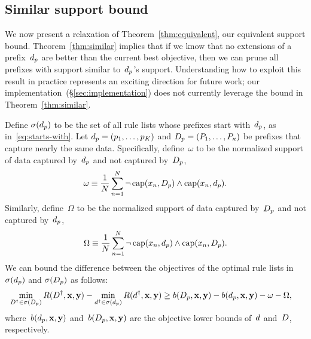 \begin{arxiv}
\subsection{Similar support bound}
\label{sec:similar}

We now present a relaxation of Theorem~\ref{thm:equivalent},
our equivalent support bound.
%
Theorem~\ref{thm:similar} implies that if we know that no extensions of
a prefix~$d_p$ are better than the current best objective,
then we can prune all prefixes with support similar to~$d_p$'s support.
%
Understanding how to exploit this result in practice
represents an exciting direction for future work;
our implementation~(\S\ref{sec:implementation}) does not
currently leverage the bound in Theorem~\ref{thm:similar}.

\begin{theorem}
\label{thm:similar}
Define $\sigma(d_p)$ to be the set of all rule lists
whose prefixes start with~$d_p$, as in~\eqref{eq:starts-with}.
%
Let ${d_p = (p_1, \dots, p_K)}$ and
${D_p = (P_1, \dots, P_{\kappa})}$ be prefixes
that capture nearly the same data.
%
Specifically, define~$\omega$ to be the normalized support
of data captured by~$d_p$ and not captured by~$D_p$, \ie
\begin{align}
\omega \equiv \frac{1}{N} \sum_{n=1}^N
  \neg\, \Cap(x_n, \PrefixB)
  \wedge \Cap(x_n, \Prefix). %
\label{eq:omega}
\end{align}
%
Similarly, define~$\Omega$ to be the normalized support
of data captured by~$D_p$ and not captured by~$d_p$, \ie
\begin{align}
\Omega \equiv \frac{1}{N} \sum_{n=1}^N
  \neg\, \Cap(x_n, \Prefix)
  \wedge \Cap(x_n, \PrefixB). %
\label{eq:big-omega}
\end{align}
We can bound the difference between the objectives of the
optimal rule lists in~$\sigma(d_p)$
and $\sigma(D_p)$ as follows:
\begin{align}
\min_{{D}^\dagger \in \sigma(D_p)} R({D}^\dagger, \mathbf{x}, \mathbf{y})
- \min_{{d}^\dagger \in \sigma(d_p)} R({d}^\dagger, \mathbf{x}, \mathbf{y})
&\ge b(D_p, \mathbf{x}, \mathbf{y}) - b(d_p, \mathbf{x}, \mathbf{y}) - \omega - \Omega,
\label{eq:similar}
\end{align}
where~$b(d_p, \mathbf{x}, \mathbf{y})$ and~$b(D_p, \mathbf{x}, \mathbf{y})$ are the
objective lower bounds of~${d}$ and~${D}$, respectively.
\end{theorem}


\end{arxiv}
